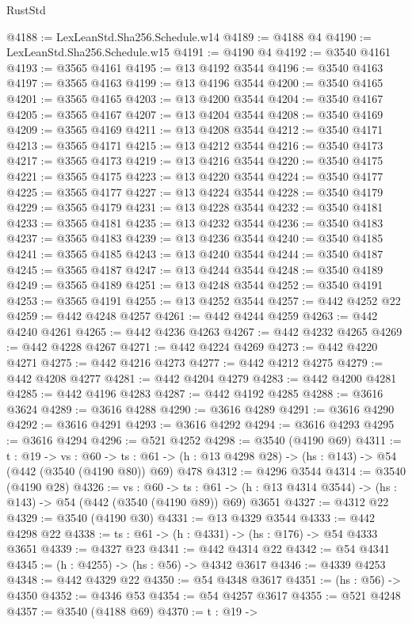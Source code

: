 \begin{lexlean}{RustStd}
\begin{coremodule}
@4188 := LexLeanStd.Sha256.Schedule.w14
@4189 := @4188 @4
@4190 := LexLeanStd.Sha256.Schedule.w15
@4191 := @4190 @4
@4192 := @3540 @4161
@4193 := @3565 @4161
@4195 := @13 @4192 @3544
@4196 := @3540 @4163
@4197 := @3565 @4163
@4199 := @13 @4196 @3544
@4200 := @3540 @4165
@4201 := @3565 @4165
@4203 := @13 @4200 @3544
@4204 := @3540 @4167
@4205 := @3565 @4167
@4207 := @13 @4204 @3544
@4208 := @3540 @4169
@4209 := @3565 @4169
@4211 := @13 @4208 @3544
@4212 := @3540 @4171
@4213 := @3565 @4171
@4215 := @13 @4212 @3544
@4216 := @3540 @4173
@4217 := @3565 @4173
@4219 := @13 @4216 @3544
@4220 := @3540 @4175
@4221 := @3565 @4175
@4223 := @13 @4220 @3544
@4224 := @3540 @4177
@4225 := @3565 @4177
@4227 := @13 @4224 @3544
@4228 := @3540 @4179
@4229 := @3565 @4179
@4231 := @13 @4228 @3544
@4232 := @3540 @4181
@4233 := @3565 @4181
@4235 := @13 @4232 @3544
@4236 := @3540 @4183
@4237 := @3565 @4183
@4239 := @13 @4236 @3544
@4240 := @3540 @4185
@4241 := @3565 @4185
@4243 := @13 @4240 @3544
@4244 := @3540 @4187
@4245 := @3565 @4187
@4247 := @13 @4244 @3544
@4248 := @3540 @4189
@4249 := @3565 @4189
@4251 := @13 @4248 @3544
@4252 := @3540 @4191
@4253 := @3565 @4191
@4255 := @13 @4252 @3544
@4257 := @442 @4252 @22
@4259 := @442 @4248 @4257
@4261 := @442 @4244 @4259
@4263 := @442 @4240 @4261
@4265 := @442 @4236 @4263
@4267 := @442 @4232 @4265
@4269 := @442 @4228 @4267
@4271 := @442 @4224 @4269
@4273 := @442 @4220 @4271
@4275 := @442 @4216 @4273
@4277 := @442 @4212 @4275
@4279 := @442 @4208 @4277
@4281 := @442 @4204 @4279
@4283 := @442 @4200 @4281
@4285 := @442 @4196 @4283
@4287 := @442 @4192 @4285
@4288 := @3616 @3624
@4289 := @3616 @4288
@4290 := @3616 @4289
@4291 := @3616 @4290
@4292 := @3616 @4291
@4293 := @3616 @4292
@4294 := @3616 @4293
@4295 := @3616 @4294
@4296 := @521 @4252
@4298 := @3540 (@4190 @69)
@4311 := {t : @19} ->
  {vs : @60} ->
  {ts : @61} -> (h : @13 @4298 @28) -> (hs : @143) -> @54 (@442 (@3540 (@4190 @80)) @69) @478
@4312 := @4296 @3544
@4314 := @3540 (@4190 @28)
@4326 := {vs : @60} ->
  {ts : @61} -> (h : @13 @4314 @3544) -> (hs : @143) -> @54 (@442 (@3540 (@4190 @89)) @69) @3651
@4327 := @4312 @22
@4329 := @3540 (@4190 @30)
@4331 := @13 @4329 @3544
@4333 := @442 @4298 @22
@4338 := {ts : @61} -> (h : @4331) -> (hs : @176) -> @54 @4333 @3651
@4339 := @4327 @23
@4341 := @442 @4314 @22
@4342 := @54 @4341
@4345 := (h : @4255) -> (hs : @56) -> @4342 @3617
@4346 := @4339 @4253
@4348 := @442 @4329 @22
@4350 := @54 @4348 @3617
@4351 := (hs : @56) -> @4350
@4352 := @4346 @53
@4354 := @54 @4257 @3617
@4355 := @521 @4248
@4357 := @3540 (@4188 @69)
@4370 := {t : @19} ->

\end{coremodule}
\end{lexlean}
